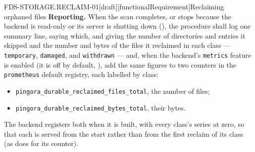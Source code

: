 \begin{requirement}{FDS-STORAGE.RECLAIM-01}[draft][functionalRequirement]{Reclaiming orphaned files}
  \textbf{Reporting.} When the scan completes, or stops because the backend
  is read-only or its server is shutting down
  (), the procedure shall log one summary
  line, saying which, and giving the number of directories and
  entries it skipped and the number and bytes of the files it reclaimed in
  each
  class --- \texttt{temporary}, \texttt{damaged}, and \texttt{withdrawn} ---
  and, when the backend's \texttt{metrics} feature is enabled (it is off by
  default, ), add the same figures to two counters
  in the \texttt{prometheus} default registry, each labelled by class:
  \begin{itemize}
    \item \texttt{pingora\_durable\_reclaimed\_files\_total}, the
      number of files;
    \item \texttt{pingora\_durable\_reclaimed\_bytes\_total}, their
      bytes.
  \end{itemize}
  The backend registers both when it is built, with every class's series
  at zero, so that each is served from the start rather than from the first
  reclaim of its class (as  does for
  its counter).


\end{requirement}
